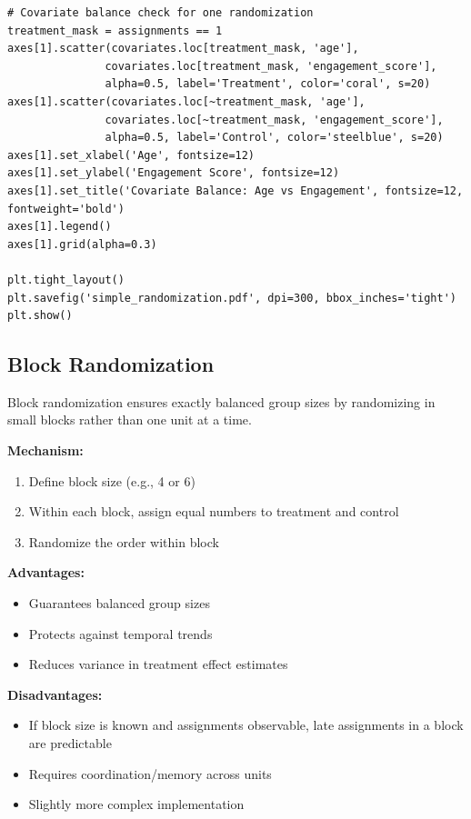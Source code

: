 \begin{lstlisting}
# Covariate balance check for one randomization
treatment_mask = assignments == 1
axes[1].scatter(covariates.loc[treatment_mask, 'age'],
               covariates.loc[treatment_mask, 'engagement_score'],
               alpha=0.5, label='Treatment', color='coral', s=20)
axes[1].scatter(covariates.loc[~treatment_mask, 'age'],
               covariates.loc[~treatment_mask, 'engagement_score'],
               alpha=0.5, label='Control', color='steelblue', s=20)
axes[1].set_xlabel('Age', fontsize=12)
axes[1].set_ylabel('Engagement Score', fontsize=12)
axes[1].set_title('Covariate Balance: Age vs Engagement', fontsize=12, fontweight='bold')
axes[1].legend()
axes[1].grid(alpha=0.3)

plt.tight_layout()
plt.savefig('simple_randomization.pdf', dpi=300, bbox_inches='tight')
plt.show()
\end{lstlisting}

\subsection{Block Randomization}

Block randomization ensures exactly balanced group sizes by randomizing in small blocks rather than one unit at a time.

\textbf{Mechanism:}
\begin{enumerate}
    \item Define block size (e.g., 4 or 6)
    \item Within each block, assign equal numbers to treatment and control
    \item Randomize the order within block
\end{enumerate}

\textbf{Advantages:}
\begin{itemize}
    \item Guarantees balanced group sizes
    \item Protects against temporal trends
    \item Reduces variance in treatment effect estimates
\end{itemize}

\textbf{Disadvantages:}
\begin{itemize}
    \item If block size is known and assignments observable, late assignments in a block are predictable
    \item Requires coordination/memory across units
    \item Slightly more complex implementation
\end{itemize}

